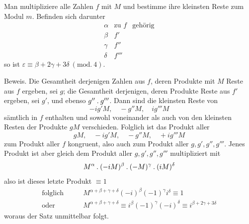 Man multipliziere alle Zahlen $f$ mit $M$ und bestimme ihre kleinsten Reste zum Modul $m$. Befinden sich darunter
\[
\begin{array}{cll}
\alpha&\text{zu }f&\text{gehörig}\\
\beta&f'&\\
\gamma&f''&\\
\delta&f'''&
\end{array}
\]
so ist $\varepsilon\equiv\beta+2\gamma+3\delta\ (\mathrm{mod.}\ 4)$.

Beweis. Die Gesamtheit derjenigen Zahlen aus $f$, deren Produkte mit $M$ Reste aus $f$ ergeben, sei $g$; die Gesamtheit derjenigen, deren Produkte Reste aus $f'$ ergeben, sei $g'$, und ebenso $g''\mathbin{.} g'''$. Dann sind die kleinsten Reste von
\begingroup{}
\[
-ig'M,\quad -g''M,\quad ig'''M
\]
sämtlich in $f$ enthalten und sowohl voneinander als auch von den kleinsten Resten der Produkte $gM$ verschieden. Folglich ist das Produkt aller
\[
gM,\quad -ig'M,\quad -g''M,\quad +ig'''M
\]
zum Produkt aller $f$ kongruent, also auch zum Produkt aller $g,g',g'',g'''$. Jenes Produkt ist aber gleich dem Produkt aller $g,g',g'',g'''$ multipliziert mit
\[
M^{\alpha}\mathbin{.}(-iM)^{\beta}\mathbin{.}(-M)^{\gamma}\mathbin{.}(iM)^{\delta}
\]
also ist dieses letzte Produkt $\equiv1$
\[
\begin{aligned}
\text{folglich}\qquad&M^{\alpha+\beta+\gamma+\delta}(-i)^{\beta}(-1)^{\gamma}i^{\delta}\equiv1\\
\text{oder}\qquad&M^{\alpha+\beta+\gamma+\delta}\equiv i^{\beta}(-1)^{\gamma}(-i)^{\delta}\equiv i^{\beta+2\gamma+3\delta}
\end{aligned}
\]
woraus der Satz unmittelbar folgt.\endgroup

